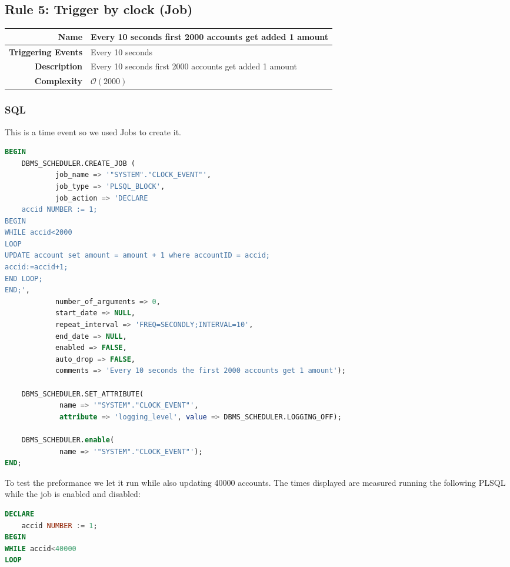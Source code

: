 \documentclass[a4paper, 10pt]{article}
\begin{document}
\begin{minipage}\linewidth
\subsection{Rule 5: Trigger by clock (Job)}

\begin{table}[H]
\begin{tabularx}{\linewidth}{| r | X |}
\hline
\textbf{Name}              & Every 10 seconds first 2000 accounts get added 1 amount\\ \hline
\textbf{Triggering Events} & Every 10 seconds\\ \hline
\textbf{Description}       & Every 10 seconds first 2000 accounts get added 1 amount\\ \hline
\textbf{Complexity}        & $\mathcal{O}(2000)$  \\ \hline
\end{tabularx}
\end{table}

\subsubsection{SQL}
This is a time event so we used Jobs to create it.
\begin{lstlisting}[language=SQL]
BEGIN
    DBMS_SCHEDULER.CREATE_JOB (
            job_name => '"SYSTEM"."CLOCK_EVENT"',
            job_type => 'PLSQL_BLOCK',
            job_action => 'DECLARE
    accid NUMBER := 1;
BEGIN
WHILE accid<2000
LOOP
UPDATE account set amount = amount + 1 where accountID = accid;
accid:=accid+1;
END LOOP;
END;',
            number_of_arguments => 0,
            start_date => NULL,
            repeat_interval => 'FREQ=SECONDLY;INTERVAL=10',
            end_date => NULL,
            enabled => FALSE,
            auto_drop => FALSE,
            comments => 'Every 10 seconds the first 2000 accounts get 1 amount');

    DBMS_SCHEDULER.SET_ATTRIBUTE( 
             name => '"SYSTEM"."CLOCK_EVENT"', 
             attribute => 'logging_level', value => DBMS_SCHEDULER.LOGGING_OFF);
  
    DBMS_SCHEDULER.enable(
             name => '"SYSTEM"."CLOCK_EVENT"');
END;
\end{lstlisting}
To test the preformance we let it run while also updating 40000 accounts. The times displayed are measured running the following PLSQL while the job is enabled and disabled:
\begin{lstlisting}[language=SQL]
DECLARE
    accid NUMBER := 1;
BEGIN
WHILE accid<40000
LOOP


\end{lstlisting}
\end{minipage}
\end{document}
